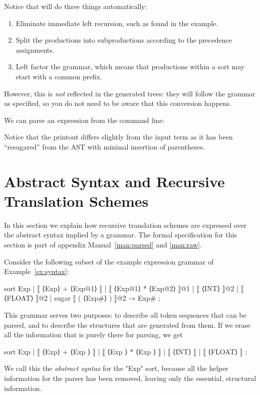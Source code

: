 \documentclass[11pt]{article} %
\begin{document}
Notice that \HAX will do three things automatically:
\begin{enumerate}
\item Eliminate immediate left recursion, such as found in the example.
\item Split the productions into subproductions according to the precedence assignments.
\item Left factor the grammar, which means that productions within a sort may start with a common
  prefix.
\end{enumerate}
However, this is \emph{not} reflected in the generated trees: they will follow the grammar as
specified, so you do not need to be aware that this conversion happens.

\begin{commands}
  We can parse an expression from the command line:
  Notice that the printout differs slightly from the input term as it has been ``resugared'' from
  the AST with minimal insertion of parentheses.
\end{commands}


\section{Abstract Syntax and Recursive Translation Schemes}
\label{sec:schemes}

In this section we explain how recursive translation schemes are expressed over the abstract syntax
implied by a grammar. The formal specification for this section is part of appendix
Manual~\ref{man:parsed} and \ref{man:raw}.

\begin{example}\label{ex:ast}%
  Consider the following subset of the example expression grammar of Example~\ref{ex:syntax}:
  \begin{hacs}[xleftmargin=\parindent]
sort Exp  | ⟦ ⟨Exp⟩ + ⟨Exp@1⟩ ⟧
          | ⟦ ⟨Exp@1⟩ * ⟨Exp@2⟩ ⟧@1
          | ⟦ ⟨INT⟩ ⟧@2
          | ⟦ ⟨FLOAT⟩ ⟧@2
          | sugar ⟦ ( ⟨Exp#⟩ ) ⟧@2 → Exp# ;
  \end{hacs}
  This grammar serves two purposes: to describe all token sequences that can be parsed, and to
  describe the structures that are generated from them. If we erase all the information that is
  purely there for parsing, we get
  \begin{hacs}[xleftmargin=\parindent]
sort Exp  | ⟦ ⟨Exp⟩ + ⟨Exp  ⟩ ⟧
          | ⟦ ⟨Exp  ⟩ * ⟨Exp  ⟩ ⟧
          | ⟦ ⟨INT⟩ ⟧
          | ⟦ ⟨FLOAT⟩ ⟧
                                          ;
  \end{hacs}
  We call this the \emph{abstract syntax} for the "Exp" sort, because all the helper information
  for the parser has been removed, leaving only the essential, structural information.
\end{example}
\end{document}
